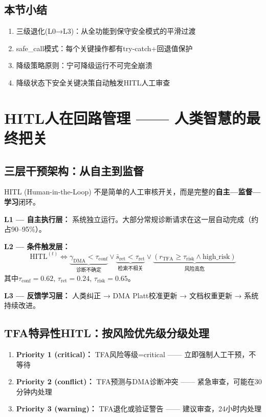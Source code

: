 \documentclass[11pt,a4paper]{ctexart}
\begin{document}
\subsection{本节小结}

\begin{enumerate}[nosep]
\item 三级退化(L0→L3)：从全功能到保守安全模式的平滑过渡
\item safe\_call模式：每个关键操作都有try-catch+回退值保护
\item 降级策略原则：宁可降级运行不可完全崩溃
\item 降级状态下安全关键决策自动触发HITL人工审查
\end{enumerate}

\newpage

\section{HITL人在回路管理 —— 人类智慧的最终把关}

\subsection{三层干预架构：从自主到监督}

HITL (Human-in-the-Loop) 不是简单的人工审核开关，而是完整的\textbf{自主—监督—学习}闭环。

\textbf{L1 — 自主执行层：} 系统独立运行。大部分常规诊断请求在这一层自动完成（约占90--95\%）。

\textbf{L2 — 条件触发层：}
\begin{equation}
\text{HITL}^{(t)} \iff \underbrace{\gamma_{\text{DMA}} < \tau_{\text{conf}}}_{\text{诊断不确定}} \lor \underbrace{\bar{s}_{\text{ret}} < \tau_{\text{ret}}}_{\text{检索不相关}} \lor \underbrace{(r_{\text{TFA}} \geq \tau_{\text{risk}} \land \text{high\_risk})}_{\text{风险高危}}
\end{equation}
其中$\tau_{\text{conf}} = 0.62$, $\tau_{\text{ret}} = 0.24$, $\tau_{\text{risk}} = 0.65$。

\textbf{L3 — 反馈学习层：} 人类纠正 → DMA Platt校准更新 → 文档权重更新 → 系统持续改进。

\subsection{TFA特异性HITL：按风险优先级分级处理}

\begin{enumerate}[nosep]
\item \textbf{Priority 1 (critical)：} TFA风险等级=critical —— 立即强制人工干预，不等待
\item \textbf{Priority 2 (conflict)：} TFA预测与DMA诊断冲突 —— 紧急审查，可能在30分钟内处理
\item \textbf{Priority 3 (warning)：} TFA退化或验证警告 —— 建议审查，24小时内处理
\end{enumerate}
\end{document}
